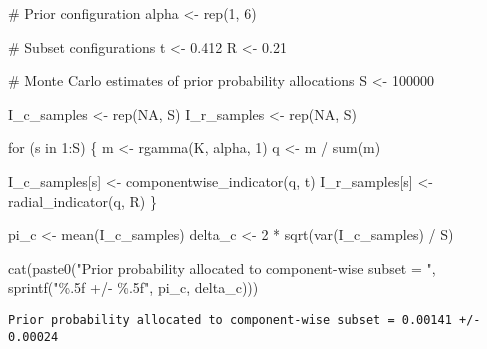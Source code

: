\documentclass[
  letterpaper,
  DIV=11,
  numbers=noendperiod]{scrartcl}
\newenvironment{Shaded}{\begin{snugshade}}{\end{snugshade}}
\newcommand{\CommentTok}[1]{\textcolor[rgb]{0.37,0.37,0.37}{#1}}
\newcommand{\ConstantTok}[1]{\textcolor[rgb]{0.56,0.35,0.01}{#1}}
\newcommand{\ControlFlowTok}[1]{\textcolor[rgb]{0.00,0.23,0.31}{#1}}
\newcommand{\DecValTok}[1]{\textcolor[rgb]{0.68,0.00,0.00}{#1}}
\newcommand{\FloatTok}[1]{\textcolor[rgb]{0.68,0.00,0.00}{#1}}
\newcommand{\FunctionTok}[1]{\textcolor[rgb]{0.28,0.35,0.67}{#1}}
\newcommand{\NormalTok}[1]{\textcolor[rgb]{0.00,0.23,0.31}{#1}}
\newcommand{\OtherTok}[1]{\textcolor[rgb]{0.00,0.23,0.31}{#1}}
\newcommand{\SpecialCharTok}[1]{\textcolor[rgb]{0.37,0.37,0.37}{#1}}
\newcommand{\StringTok}[1]{\textcolor[rgb]{0.13,0.47,0.30}{#1}}
\begin{document}
\begin{Shaded}
\begin{Highlighting}[]
\CommentTok{\# Prior configuration}
\NormalTok{alpha }\OtherTok{\textless{}{-}} \FunctionTok{rep}\NormalTok{(}\DecValTok{1}\NormalTok{, }\DecValTok{6}\NormalTok{)}

\CommentTok{\# Subset configurations}
\NormalTok{t }\OtherTok{\textless{}{-}} \FloatTok{0.412}
\NormalTok{R }\OtherTok{\textless{}{-}} \FloatTok{0.21}

\CommentTok{\# Monte Carlo estimates of prior probability allocations}
\NormalTok{S }\OtherTok{\textless{}{-}} \DecValTok{100000}

\NormalTok{I\_c\_samples }\OtherTok{\textless{}{-}} \FunctionTok{rep}\NormalTok{(}\ConstantTok{NA}\NormalTok{, S)}
\NormalTok{I\_r\_samples }\OtherTok{\textless{}{-}} \FunctionTok{rep}\NormalTok{(}\ConstantTok{NA}\NormalTok{, S)}

\ControlFlowTok{for}\NormalTok{ (s }\ControlFlowTok{in} \DecValTok{1}\SpecialCharTok{:}\NormalTok{S) \{}
\NormalTok{  m }\OtherTok{\textless{}{-}} \FunctionTok{rgamma}\NormalTok{(K, alpha, }\DecValTok{1}\NormalTok{)}
\NormalTok{  q }\OtherTok{\textless{}{-}}\NormalTok{ m }\SpecialCharTok{/} \FunctionTok{sum}\NormalTok{(m)}

\NormalTok{  I\_c\_samples[s] }\OtherTok{\textless{}{-}} \FunctionTok{componentwise\_indicator}\NormalTok{(q, t)}
\NormalTok{  I\_r\_samples[s] }\OtherTok{\textless{}{-}} \FunctionTok{radial\_indicator}\NormalTok{(q, R)}
\NormalTok{\}}
\end{Highlighting}
\end{Shaded}

\begin{Shaded}
\begin{Highlighting}[]
\NormalTok{pi\_c }\OtherTok{\textless{}{-}} \FunctionTok{mean}\NormalTok{(I\_c\_samples)}
\NormalTok{delta\_c }\OtherTok{\textless{}{-}} \DecValTok{2} \SpecialCharTok{*} \FunctionTok{sqrt}\NormalTok{(}\FunctionTok{var}\NormalTok{(I\_c\_samples) }\SpecialCharTok{/}\NormalTok{ S)}

\FunctionTok{cat}\NormalTok{(}\FunctionTok{paste0}\NormalTok{(}\StringTok{"Prior probability allocated to component{-}wise subset = "}\NormalTok{,}
           \FunctionTok{sprintf}\NormalTok{(}\StringTok{"\%.5f +/{-} \%.5f"}\NormalTok{, pi\_c, delta\_c)))}
\end{Highlighting}
\end{Shaded}

\begin{verbatim}
Prior probability allocated to component-wise subset = 0.00141 +/- 0.00024
\end{verbatim}
\end{document}
